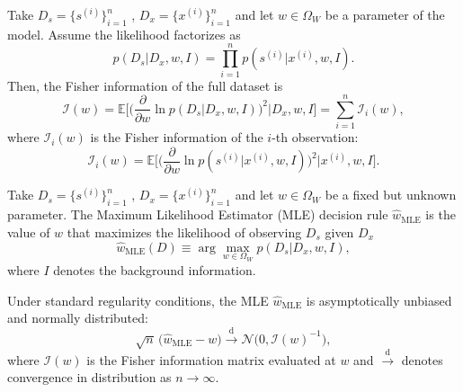 \begin{theorem}
	\label{thm:fisher_sample}
	Take $D_s= \{s^{(i)}\}_{i=1}^n$ , $D_x = \{x^{(i)}\}_{i=1}^n$ and let $w \in \Omega_W$ be a parameter of the model. Assume the likelihood factorizes as
	\begin{equation}
		p(D_s | D_x, w, I) = \prod_{i=1}^{n} p(s^{(i)} | x^{(i)}, w, I).
	\end{equation}
	Then, the Fisher information of the full dataset is
	\begin{equation}
		\mathcal{I}(w) 
		= \mathbb{E}\Bigg[\Big(\frac{\partial}{\partial w} \ln p(D_s | D_x, w, I)\Big)^2 \Bigg| D_x, w, I \Bigg] 
		= \sum_{i=1}^{n} \mathcal{I}_i(w),
	\end{equation}
	where $\mathcal{I}_i(w)$ is the Fisher information of the $i$-th observation:
	\begin{equation}
		\mathcal{I}_i(w) = \mathbb{E}\Bigg[\Big(\frac{\partial}{\partial w} \ln p(s^{(i)} | x^{(i)}, w, I)\Big)^2 \Bigg| x^{(i)}, w, I \Bigg].
	\end{equation}
\end{theorem}


\begin{definition}
	\label{def:MLE}
	Take $D_s= \{s^{(i)}\}_{i=1}^n$ , $D_x = \{x^{(i)}\}_{i=1}^n$ and let $w \in \Omega_W$ be a fixed but unknown parameter. The Maximum Likelihood Estimator (MLE) decision rule $\hat{w}_{\mathrm{MLE}}$ is the value of $w$ that maximizes the likelihood of observing $D_s$ given $D_x$
	\begin{equation}
		\hat{w}_{\mathrm{MLE}}(D) \equiv \arg \max_{w \in \Omega_W} p(D_s | D_x, w, I),
	\end{equation}
	where $I$ denotes the background information.
\end{definition}


\begin{theorem}
	\label{thm:unbiased_mle}
	Under standard regularity conditions, the MLE $\hat{w}_{\mathrm{MLE}}$ is asymptotically unbiased and normally distributed:
	\begin{equation}
		\sqrt{n}\,\big(\hat{w}_{\mathrm{MLE}} - w\big) \xrightarrow{\text{d}} \mathcal{N}\big(0, \mathcal{I}(w)^{-1}\big),
	\end{equation}
	where $\mathcal{I}(w)$ is the Fisher information matrix evaluated at $w$ and $\xrightarrow{\text{d}}$ denotes convergence in distribution as $n \to \infty$.
\end{theorem}

